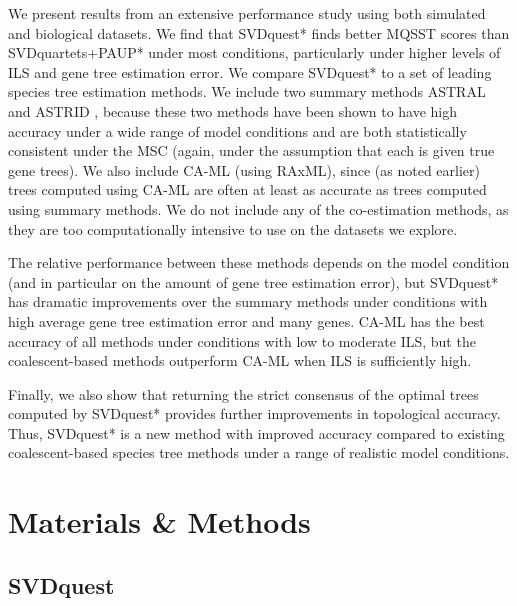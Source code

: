 We present results from an extensive performance study using both simulated and biological datasets.
We find that SVDquest* finds better MQSST scores than SVDquartets+PAUP* under most
conditions, particularly under higher levels of ILS and gene tree
estimation error.  
We compare SVDquest* to a set of leading species tree estimation 
methods. We include two summary methods
ASTRAL \cite{astral,mirarab2015astral} and
ASTRID \cite{vachaspati2015astrid}, because these two methods have been shown to
have high accuracy under a wide range of model conditions and are both
statistically consistent under the MSC {(again, under the assumption that each is given true gene trees)}.
We also include  CA-ML (using RAxML), since (as noted earlier)  trees computed using CA-ML are often at least as accurate as
trees computed using summary methods. 
We do not include any of the co-estimation methods, as they are too computationally intensive to use
on the datasets we explore.

The relative performance between these methods depends on the
model condition (and in particular on the amount of gene tree estimation 
error), but SVDquest*  has dramatic improvements over the summary
methods under conditions with high
average gene tree estimation error and many genes.  
CA-ML has the best
accuracy of all methods under conditions with low to moderate ILS, but
the coalescent-based methods outperform CA-ML when ILS is sufficiently
high. 

Finally, we also show that returning the strict consensus of the optimal trees
computed by SVDquest* provides further improvements in topological accuracy. 
Thus, SVDquest* is a new method with improved accuracy
compared to existing coalescent-based species tree methods under a
range of realistic model conditions.


   

\section{Materials \& Methods}

\subsection{SVDquest}

